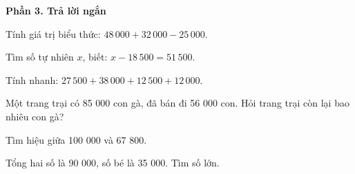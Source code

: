 \textbf{Phần 3. Trả lời ngắn}

\begin{ex} %
Tính giá trị biểu thức: $48\,000 + 32\,000 - 25\,000$.
\end{ex}

\begin{ex} %
Tìm số tự nhiên $x$, biết: $x - 18\,500 = 51\,500$.
\end{ex}

\begin{ex} %
Tính nhanh: $27\,500 + 38\,000 + 12\,500 + 12\,000$.
\end{ex}

\begin{ex} %
Một trang trại có 85 000 con gà, đã bán đi 56 000 con. Hỏi trang trại còn lại bao nhiêu con gà?
\end{ex}

\begin{ex} %
Tìm hiệu giữa 100 000 và 67 800.
\end{ex}

\begin{ex} %
Tổng hai số là 90 000, số bé là 35 000. Tìm số lớn.
\end{ex}
